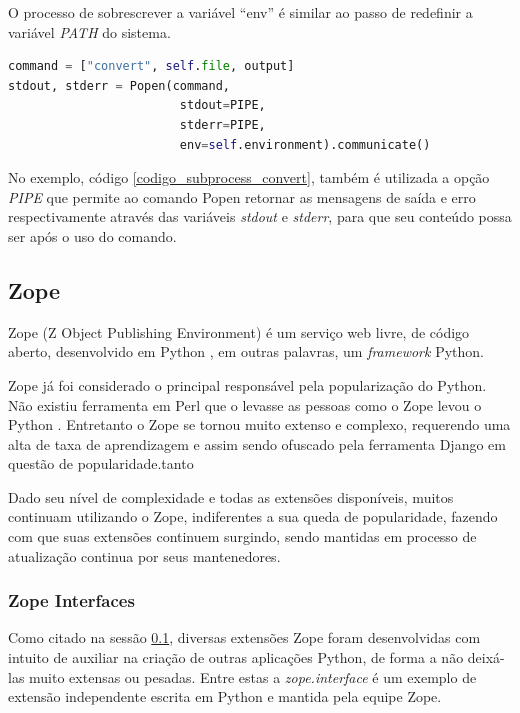 O processo de sobrescrever a variável ``env'' é similar ao passo de redefinir a variável \textit{PATH} do sistema.

{\singlespace
\begin{lstlisting}[caption=Exemplo de uso do Subprocess com \textit{PIPE} extraído do CloudOoo,language=python,label={codigo_subprocess_convert}]
command = ["convert", self.file, output]
stdout, stderr = Popen(command, 
                        stdout=PIPE,
                        stderr=PIPE,
                        env=self.environment).communicate()
\end{lstlisting}
}


No exemplo, código \ref{codigo_subprocess_convert}, também é utilizada a opção \textit{PIPE} que permite ao comando Popen retornar as mensagens de saída e erro respectivamente através das variáveis \textit{stdout} e \textit{stderr}, para que seu conteúdo possa ser após o uso do comando.


\subsection{Zope}
\label{zope}

Zope (Z Object Publishing Environment) é um serviço web livre, de código aberto, desenvolvido em Python \cite{ZOPE2}, em outras palavras, um \textit{framework} Python.

Zope já foi considerado o principal responsável pela popularização do Python. Não existiu ferramenta em Perl que o levasse as pessoas como o Zope levou o Python \cite{UDELL}. Entretanto o Zope se tornou muito extenso e complexo, requerendo uma alta de taxa de aprendizagem e assim sendo ofuscado pela ferramenta Django em questão de popularidade.tanto

Dado seu nível de complexidade e todas as extensões disponíveis, muitos continuam utilizando o Zope, indiferentes a sua queda de popularidade, fazendo com que suas extensões continuem surgindo, sendo mantidas em processo de atualização continua por seus mantenedores.


\subsubsection{Zope Interfaces}

Como citado na sessão \ref{zope}, diversas extensões Zope foram desenvolvidas com intuito de auxiliar na criação de outras aplicações Python, de forma a não deixá-las muito extensas ou pesadas. Entre estas a \textit{zope.interface} é um exemplo de extensão independente escrita em Python e mantida pela equipe Zope.

